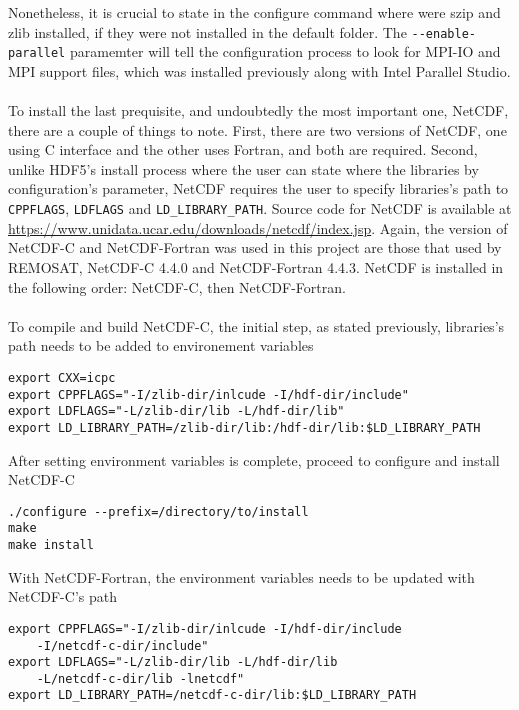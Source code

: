 Nonetheless, it is crucial to state in the configure command where were szip and zlib installed, if they were not installed in the default folder. The \verb|--enable-parallel| paramemter will tell the configuration process to look for MPI-IO and MPI support files, which was installed previously along with Intel Parallel Studio. \\
~\\
To install the last prequisite, and undoubtedly the most important one, NetCDF, there are a couple of things to note. First, there are two versions of NetCDF, one using C interface and the other uses Fortran, and both are required. Second, unlike HDF5's install process where the user can state where the libraries by configuration's parameter, NetCDF requires the user to specify libraries's path to \verb|CPPFLAGS|, \verb|LDFLAGS| and \verb|LD_LIBRARY_PATH|. Source code for NetCDF is available at \url{https://www.unidata.ucar.edu/downloads/netcdf/index.jsp}. Again, the version of NetCDF-C and NetCDF-Fortran was used in this project are those that used by REMOSAT, NetCDF-C 4.4.0 and NetCDF-Fortran 4.4.3. NetCDF is installed in the following order: NetCDF-C, then NetCDF-Fortran. \\
~\\
To compile and build NetCDF-C, the initial step, as stated previously, libraries's path needs to be added to environement variables
\begin{center}
\begin{BVerbatim}
export CXX=icpc
export CPPFLAGS="-I/zlib-dir/inlcude -I/hdf-dir/include"
export LDFLAGS="-L/zlib-dir/lib -L/hdf-dir/lib"
export LD_LIBRARY_PATH=/zlib-dir/lib:/hdf-dir/lib:$LD_LIBRARY_PATH
\end{BVerbatim}
\end{center}
After setting environment variables is complete, proceed to configure and install NetCDF-C
\begin{center}
\begin{BVerbatim}
./configure --prefix=/directory/to/install
make
make install
\end{BVerbatim}
\end{center}
With NetCDF-Fortran, the environment variables needs to be updated with NetCDF-C's path
\begin{center}
\begin{BVerbatim}
export CPPFLAGS="-I/zlib-dir/inlcude -I/hdf-dir/include 
	-I/netcdf-c-dir/include"
export LDFLAGS="-L/zlib-dir/lib -L/hdf-dir/lib 
	-L/netcdf-c-dir/lib -lnetcdf"
export LD_LIBRARY_PATH=/netcdf-c-dir/lib:$LD_LIBRARY_PATH
\end{BVerbatim}
\end{center}
